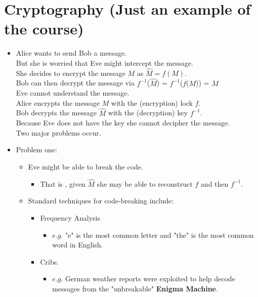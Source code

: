 \documentclass[12pt]{article}
\begin{document}
\section{Cryptography (Just an example of the course)}
\renewcommand{\labelitemii}{$\circ$}
\renewcommand{\labelitemiii}{$\cdot$}
\renewcommand{\labelitemiii}{$\rightarrow$}
\begin{itemize}
\item Alice wants to send Bob a message.\\
\noindent But she is worried that Eve might intercept the message.\\
\noindent She decides to encrypt the message $M$ as $\hat{M} = f(M)$.\\
\noindent Bob can then decrypt the message via $f^{-1}$($\hat{M}$) = $f^{-1}$($f$($M$)) = $M$\\
\noindent Eve cannot understand the message.\\
\noindent Alice encrypts the message $M$ with the (encryption) lock $f$.\\
\noindent Bob decrypts the message $\hat{M}$ with the (decryption) key $f^{-1}$.\\
\noindent Because Eve does not have the key she cannot decipher the message.\\
\noindent Two major problems occur.
\item Problem one:
	\begin{itemize}
	\item Eve might be able to break the code.
		\begin{itemize}
		\item That is , given $\hat{M}$ she may be able to reconstruct $f$ and then $f^{-1}$.
		\end{itemize}
	\item Standard techniques for code-breaking include:
		\begin{itemize}
		\item Frequency Analysis
			\begin{itemize}
			\item $e.g.$ "e" is the most common letter and "the" is the most common word in 					English.
			\end{itemize}
		\item Cribs. 
			\begin{itemize}
			\item $e.g.$ German weather reports were exploited to help decode messages 						from 	the "unbreakable" \textbf{Enigma Machine}.
			\end{itemize}
		\end{itemize}
	\end{itemize}


\end{itemize}
\end{document}
